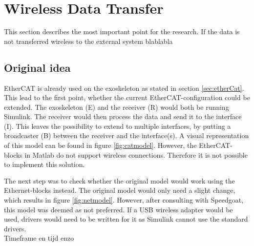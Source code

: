 \section{Wireless Data Transfer}
This section describes the most important point for the research. If the data is not transferred wireless to the external system blablabla

\subsection{Original idea}
EtherCAT is already used on the exoskeleton as stated in section \ref{sec:etherCat}. This lead to the first point, whether the current EtherCAT-configuration could be extended. The exoskeleton (E) and the receiver (R) would both be running Simulink. The receiver would then process the data and send it to the interface (I). This leaves the possibility to  extend to multiple interfaces, by putting a broadcaster (B) between the receiver and the interface(s). A visual representation of this model can be found in figure \ref{fig:catmodel}. However, the EtherCAT-blocks in Matlab \cite{web:ethercat} do not support wireless connections. Therefore it is not possible to implement this solution.

The next step was to check whether the original model would work using the Ethernet-blocks \cite{web:ethernet} instead. The original model would only need a slight change, which results in figure \ref{fig:netmodel}. However, after consulting with Speedgoat, this model was deemed as not preferred. If a USB wireless adapter would be used, drivers would need to be written for it as Simulink cannot use the standard drivers.\\
Timeframe en tijd enzo\\

